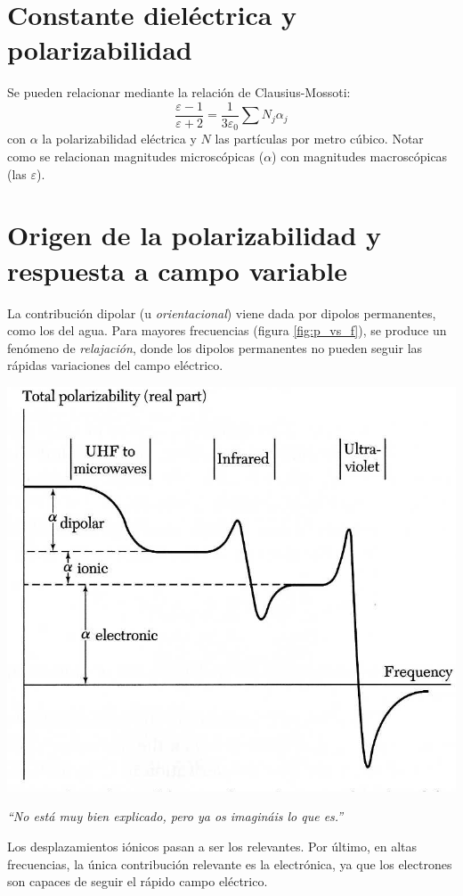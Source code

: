 \documentclass{tufte-book}
\begin{document}
\section{Constante dieléctrica y polarizabilidad}
Se pueden relacionar mediante la relación de Clausius-Mossoti:
\begin{equation}
    \frac{ε-1}{ε+2} =  \frac{1}{3ε_0} \sum N_j α_j
\end{equation}
con $α$ la polarizabilidad eléctrica y $N$ las partículas por
metro cúbico. Notar como se relacionan magnitudes
microscópicas ($α$) con magnitudes macroscópicas (las $ε$).

\section{Origen de la polarizabilidad y respuesta a campo variable}

La contribución dipolar (u \emph{orientacional}) viene dada por dipolos
permanentes, como los del agua. Para mayores frecuencias (figura
\ref{fig:p_vs_f}), se produce un fenómeno de \emph{relajación}, donde los
dipolos permanentes no pueden seguir las rápidas variaciones del campo
eléctrico.
\begin{marginfigure}
    \centering
    \includegraphics[width=\textwidth]{figures/polarizability_vs_freq.png}
    \caption{\itshape ``No está muy bien explicado, pero ya os imagináis lo que es.''}
    \label{fig:p_vs_f}
\end{marginfigure}
Los desplazamientos iónicos pasan a ser los relevantes. Por último,
en altas frecuencias, la única contribución relevante es la electrónica, ya que
los electrones son capaces de seguir el rápido campo eléctrico.
\end{document}
